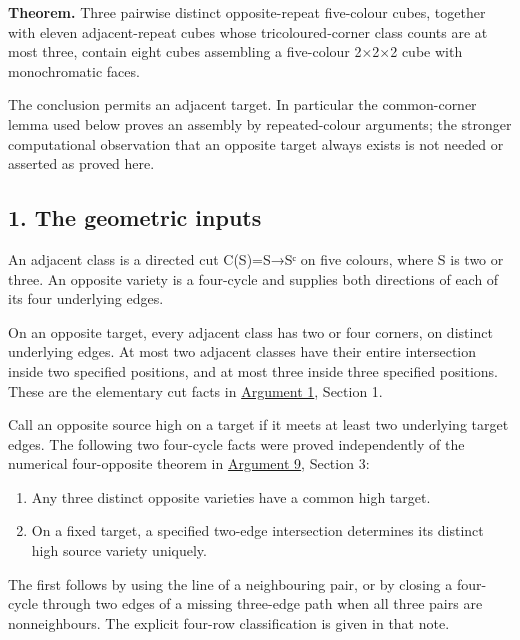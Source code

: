 \documentclass[
  10pt,
]{article}
\providecommand{\tightlist}{%
  \setlength{\itemsep}{0pt}\setlength{\parskip}{0pt}}
\begin{document}
\textbf{Theorem.} Three pairwise distinct opposite-repeat five-colour
cubes, together with eleven adjacent-repeat cubes whose
tricoloured-corner class counts are at most three, contain eight cubes
assembling a five-colour 2×2×2 cube with monochromatic faces.

The conclusion permits an adjacent target. In particular the
common-corner lemma used below proves an assembly by repeated-colour
arguments; the stronger computational observation that an opposite
target always exists is not needed or asserted as proved here.

\hypertarget{the-geometric-inputs}{%
\subsection*{1. The geometric inputs}\label{the-geometric-inputs}}

An adjacent class is a directed cut C(S)=S→Sᶜ on five colours, where
\textbar S\textbar{} is two or three. An opposite variety is a
four-cycle and supplies both directions of each of its four underlying
edges.

On an opposite target, every adjacent class has two or four corners, on
distinct underlying edges. At most two adjacent classes have their
entire intersection inside two specified positions, and at most three
inside three specified positions. These are the elementary cut facts in
\protect\hyperlink{arg-1}{Argument 1}, Section 1.

Call an opposite source high on a target if it meets at least two
underlying target edges. The following two four-cycle facts were proved
independently of the numerical four-opposite theorem in
\protect\hyperlink{arg-9}{Argument 9}, Section 3:

\begin{enumerate}
\def\labelenumi{\arabic{enumi}.}
\tightlist
\item
  Any three distinct opposite varieties have a common high target.
\item
  On a fixed target, a specified two-edge intersection determines its
  distinct high source variety uniquely.
\end{enumerate}

The first follows by using the line of a neighbouring pair, or by
closing a four-cycle through two edges of a missing three-edge path when
all three pairs are nonneighbours. The explicit four-row classification
is given in that note.
\end{document}
